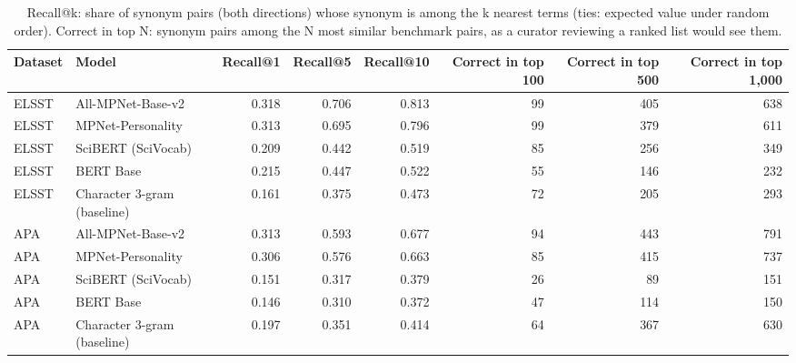 \begin{table}[ht]
\centering
\small
\caption{Recall@k: share of synonym pairs (both directions) whose synonym is among the k nearest terms (ties: expected value under random order). Correct in top N: synonym pairs among the N most similar benchmark pairs, as a curator reviewing a ranked list would see them.}
\label{tab:S7_ranking}
\begin{tabular}{llrrrrrr}
\toprule
Dataset & Model & Recall@1 & Recall@5 & Recall@10 & Correct in top 100 & Correct in top 500 & Correct in top 1,000 \\
\midrule
ELSST & All-MPNet-Base-v2 & 0.318 & 0.706 & 0.813 & 99 & 405 & 638 \\
ELSST & MPNet-Personality & 0.313 & 0.695 & 0.796 & 99 & 379 & 611 \\
ELSST & SciBERT (SciVocab) & 0.209 & 0.442 & 0.519 & 85 & 256 & 349 \\
ELSST & BERT Base & 0.215 & 0.447 & 0.522 & 55 & 146 & 232 \\
ELSST & Character 3-gram (baseline) & 0.161 & 0.375 & 0.473 & 72 & 205 & 293 \\
APA & All-MPNet-Base-v2 & 0.313 & 0.593 & 0.677 & 94 & 443 & 791 \\
APA & MPNet-Personality & 0.306 & 0.576 & 0.663 & 85 & 415 & 737 \\
APA & SciBERT (SciVocab) & 0.151 & 0.317 & 0.379 & 26 & 89 & 151 \\
APA & BERT Base & 0.146 & 0.310 & 0.372 & 47 & 114 & 150 \\
APA & Character 3-gram (baseline) & 0.197 & 0.351 & 0.414 & 64 & 367 & 630 \\
\bottomrule
\end{tabular}
\end{table}
